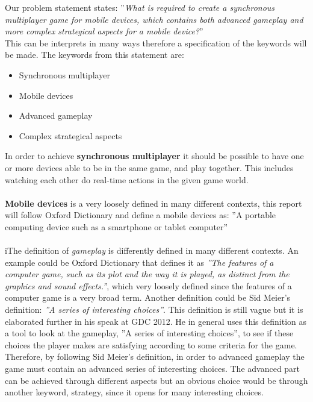Our problem statement states: ''\textit{What is required to create a synchronous multiplayer game for mobile devices, which contains both advanced
gameplay and more complex strategical aspects for a mobile device?}''\\
This can be interprets in many ways therefore a specification of the keywords will be made.
The keywords from this statement are:
\begin{itemize}
\item Synchronous multiplayer
\item Mobile devices
\item Advanced gameplay
\item Complex strategical aspects
\end{itemize}
In order to achieve \textbf{synchronous multiplayer} it should be possible to have one or more devices able to be in the same game, and play together. This includes watching each other do real-time actions in the given game world.\\\\
\textbf{Mobile devices} is a very loosely defined in many different contexts, this report will follow Oxford Dictionary and define a mobile devices as: ''A portable computing device such as a smartphone or tablet computer''\\\\
iThe definition of \textit{gameplay} is differently defined in many different contexts. An example could be Oxford Dictionary that defines it as \textit{''The features of a computer game, such as its plot and the way it is played, as distinct from the graphics and sound effects.''}, which very loosely defined since the features of a computer game is a very broad term. Another definition could be Sid Meier's definition: \textit{''A series of interesting choices''}. This definition is still vague but it is elaborated further in his speak at GDC 2012. 
He in general uses this definition as a tool to look at the gameplay, ''A series of interesting choices'', to see if these choices the player makes are satisfying according to some criteria for the game.\\
Therefore, by following Sid Meier's definition, in order to advanced gameplay the game must contain an advanced series of interesting choices.
The advanced part can be achieved through different aspects but an obvious choice would be through another keyword, strategy, since it opens for many interesting choices.\\\\
